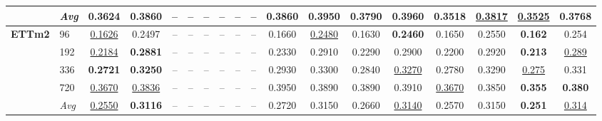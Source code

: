 \begin{tabular}{llcccccccccccccccc}
               & \textit{Avg} &         0.3624 &         0.3860 &             -- &             -- &             -- &             -- &             -- &             -- &         0.3860 &         0.3950 &         0.3790 &         0.3960 & \textbf{0.3518} & \underline{0.3817} & \underline{0.3525} & \textbf{0.3768} \\
\midrule
\textbf{ETTm2} & 96         & \underline{0.1626} &         0.2497 &             -- &             -- &             -- &             -- &             -- &             -- &         0.1660 & \underline{0.2480} &         0.1630 & \textbf{0.2460} &         0.1650 &         0.2550 & \textbf{0.162} &          0.254 \\
               & 192        & \underline{0.2184} & \textbf{0.2881} &             -- &             -- &             -- &             -- &             -- &             -- &         0.2330 &         0.2910 &         0.2290 &         0.2900 &         0.2200 &         0.2920 & \textbf{0.213} & \underline{0.289} \\
               & 336        & \textbf{0.2721} & \textbf{0.3250} &             -- &             -- &             -- &             -- &             -- &             -- &         0.2930 &         0.3300 &         0.2840 & \underline{0.3270} &         0.2780 &         0.3290 & \underline{0.275} &          0.331 \\
               & 720        & \underline{0.3670} & \underline{0.3836} &             -- &             -- &             -- &             -- &             -- &             -- &         0.3950 &         0.3890 &         0.3890 &         0.3910 & \underline{0.3670} &         0.3850 & \textbf{0.355} & \textbf{0.380} \\
               & \textit{Avg} & \underline{0.2550} & \textbf{0.3116} &             -- &             -- &             -- &             -- &             -- &             -- &         0.2720 &         0.3150 &         0.2660 & \underline{0.3140} &         0.2570 &         0.3150 & \textbf{0.251} & \underline{0.314} \\
\bottomrule
\end{tabular}
